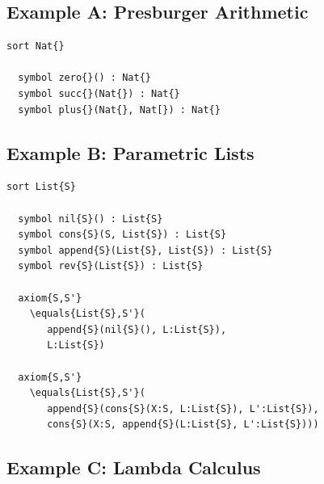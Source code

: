 \documentclass[UTF8,11pt]{article}
\theoremstyle{plain}
\theoremstyle{definition}
\theoremstyle{remark}
\begin{document}
\subsection{Example A: Presburger Arithmetic}
\begin{lstlisting}[language=kore]
  sort Nat{}
  
  symbol zero{}() : Nat{}
  symbol succ{}(Nat{}) : Nat{}
  symbol plus{}(Nat{}, Nat[}) : Nat{}
\end{lstlisting}
\subsection{Example B: Parametric Lists}
\begin{lstlisting}[language=kore]
  sort List{S}
  
  symbol nil{S}() : List{S}
  symbol cons{S}(S, List{S}) : List{S}
  symbol append{S}(List{S}, List{S}) : List{S}
  symbol rev{S}(List{S}) : List{S}
  
  axiom{S,S'} 
    \equals{List{S},S'}(
       append{S}(nil{S}(), L:List{S}),
       L:List{S})
      
  axiom{S,S'}
    \equals{List{S},S'}(
       append{S}(cons{S}(X:S, L:List{S}), L':List{S}),
       cons{S}(X:S, append{S}(L:List{S}, L':List{S})))
\end{lstlisting}

\subsection{Example C: Lambda Calculus}
\end{document}
